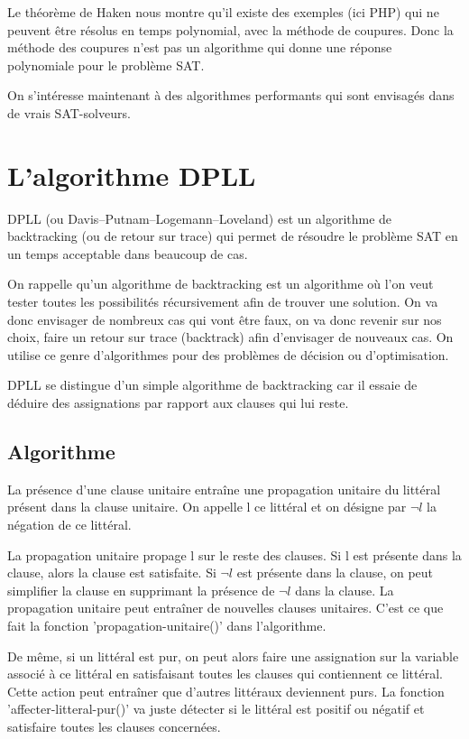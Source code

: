 \documentclass[12pt]{extarticle}
\begin{document}
Le théorème de Haken nous montre qu'il existe des exemples (ici PHP) qui ne peuvent être résolus en temps polynomial, avec la méthode de coupures. Donc la méthode des coupures n'est pas un algorithme qui donne une réponse polynomiale pour le problème SAT.

On s'intéresse maintenant à des algorithmes performants qui sont envisagés dans de vrais SAT-solveurs.


\section{L'algorithme DPLL}

DPLL (ou Davis–Putnam–Logemann–Loveland) est un algorithme de backtracking (ou de retour sur trace) qui permet de résoudre le problème SAT en un temps acceptable dans beaucoup de cas.

On rappelle qu'un algorithme de backtracking est un algorithme où l'on veut tester toutes les possibilités récursivement afin de trouver une solution. On va donc envisager de nombreux cas qui vont être faux, on va donc revenir sur nos choix, faire un retour sur trace (backtrack) afin d'envisager de nouveaux cas. On utilise ce genre d'algorithmes pour des problèmes de décision ou d'optimisation.

DPLL se distingue d'un simple algorithme de backtracking car il essaie de déduire des assignations par rapport aux clauses qui lui reste.

\subsection{Algorithme}

La présence d'une clause unitaire entraîne une propagation unitaire du littéral présent dans la clause unitaire. On appelle l ce littéral et on désigne par $\lnot{l}$ la négation de ce littéral.

La propagation unitaire propage l sur le reste des clauses. Si l est présente dans la clause, alors la clause est satisfaite. Si $\lnot{l}$ est présente dans la clause, on peut simplifier la clause en supprimant la présence de $\lnot{l}$ dans la clause. La propagation unitaire peut entraîner de nouvelles clauses unitaires. C'est ce que fait la fonction 'propagation-unitaire()' dans l'algorithme.

De même, si un littéral est pur, on peut alors faire une assignation sur la variable associé à ce littéral en satisfaisant toutes les clauses qui contiennent ce littéral. Cette action peut entraîner que d'autres littéraux deviennent purs. La fonction 'affecter-litteral-pur()' va juste détecter si le littéral est positif ou négatif et satisfaire toutes les clauses concernées.
\end{document}
